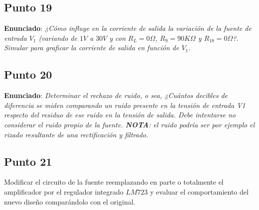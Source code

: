 


\subsection{Punto 19}

\textbf{Enunciado}: \textsl{¿Cómo influye en la corriente de salida la variación de la fuente de entrada $V_{1}$ (variando de $1 V$ a $30 V$ y con $R_{L} = 0 \Omega$, $R_{9} = 90 K\Omega$ y $R_{18} = 0 \Omega$?. Simular para graficar la corriente de salida en función de $V_{1}$.}\\




\subsection{Punto 20}

\textbf{Enunciado}: \textsl{Determinar el rechazo de ruido, o sea, ¿Cuántos decibles de diferencia se miden comparando un ruido presente en la tensión de entrada V1 respecto del residuo de ese ruido en la tensión de salida. Debe intentarse no considerar el ruido propio de la fuente. \textbf{NOTA}: el ruido podría ser por ejemplo el rizado resultante de una rectificación y filtrado.}\\





\clearpage

\subsection{Punto 21}

Modificar el circuito de la fuente reemplazando en parte o totalmente el amplificador por el regulador integrado $LM723$ y evaluar el comportamiento del nuevo diseño comparándolo con el original.

\clearpage


